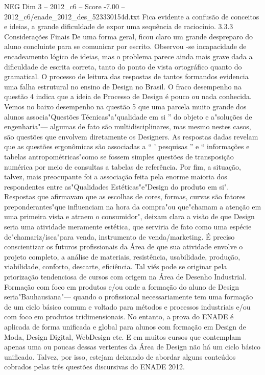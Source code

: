 \begin{textsample}{NEG Dim 3 – 2012\_c6 – Score -7.00 – 2012\_c6/enade\_2012\_des\_523330154d.txt}
Fica evidente a confusão de conceitos e ideias, a grande dificuldade de expor uma sequência de raciocínio. 3.3.3 Considerações Finais De uma forma geral, ficou claro um grande despreparo do aluno concluinte para se comunicar por escrito.
Observou -se incapacidade de encadeamento lógico de ideias, mas o problema parece ainda mais grave dada a dificuldade de escrita correta, tanto do ponto de vista ortográfico quanto do gramatical.
O processo de leitura das respostas de tantos formandos evidencia uma falha estrutural no ensino de Design no Brasil.
O fraco desempenho na questão 4 indica que a ideia de Processo de Design é pouco ou nada conhecida.
Vemos no baixo desempenho na questão 5 que uma parcela muito grande dos alunos associa"Questões Técnicas"a"qualidade em si ” do objeto e a"soluções de engenharia"— algumas de fato são multidisciplinares, mas mesmo nestes casos, são questões que envolvem diretamente os Designers.
As respostas dadas revelam que as questões ergonômicas são associadas a “ ' pesquisas ” e “ informações e tabelas antropométricas"como se fossem simples questões de transposição numérica por meio de consultas a tabelas de referência.
Por fim, a situação, talvez, mais preocupante foi a associação feita pela enorme maioria dos respondentes entre as"Qualidades Estéticas"e"Design do produto em si".
Respostas que afirmavam que as escolhas de cores, formas, curvas são fatores preponderantes"que influenciam na hora da compra"ou que"chamam a atenção em uma primeira vista e atraem o consumidor", deixam clara a visão de que Design seria uma atividade meramente estética, que serviria de fato como uma espécie de"chamariz/isca"para venda, instrumento de venda/marketing.
É preciso conscientizar os futuros profissionais da Área de que sua atividade envolve o projeto completo, a análise de materiais, resistência, usabilidade, produção, viabilidade, conforto, descarte, eficiência.
Tal viés pode se originar pela priorização tendenciosa de cursos com origem na Área de Desenho Industrial.
Formação com foco em produtos e/ou onde a formação do aluno de Design seria"Bauhausiana"— quando o profissional necessariamente tem uma formação de um ciclo básico comum e voltado para métodos e processos industriais e/ou com foco em produtos tridimensionais.
No entanto, a prova do ENADE é aplicada de forma unificada e global para alunos com formação em Design de Moda, Design Digital, WebDesign etc.
E em muitos cursos que contemplam apenas uma ou poucas dessas vertentes da Área de Design não há um ciclo básico unificado.
Talvez, por isso, estejam deixando de abordar alguns conteúdos cobrados pelas três questões discursivas do ENADE 2012.

\end{textsample}
